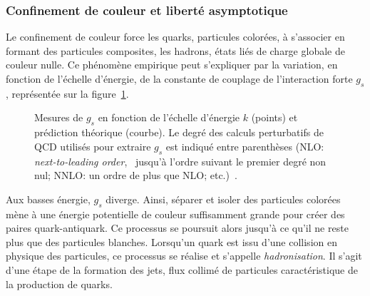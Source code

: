 \subsubsection{Confinement de couleur et liberté asymptotique}\label{chapter-MS-MSSM-section-formalisme-subsec-QCD-subsubsec-confinement}
Le confinement de couleur force les quarks, particules colorées, à s'associer en formant des particules composites, les hadrons, états liés de charge globale de couleur nulle. Ce phénomène empirique peut s'expliquer par la variation, en fonction de l'échelle d'énergie, de la constante de couplage de l'interaction forte $g_s$, représentée sur la figure~\ref{fig-g_s_fct_energy}.
\begin{figure}[h]
\centering
{}
\caption{Mesures de $g_s$ en fonction de l'échelle d'énergie $k$ (points) et prédiction théorique (courbe). Le degré des calculs perturbatifs de QCD utilisés pour extraire $g_s$ est indiqué entre parenthèses (NLO: \emph{next-to-leading order}, \ie\ jusqu'à l'ordre suivant le premier degré non nul; NNLO: un ordre de plus que NLO; etc.)~\cite{PDG_booklet_2018}.}
\label{fig-g_s_fct_energy}
\end{figure}
\par Aux basses énergie, $g_s$ diverge.
Ainsi, séparer et isoler des particules colorées mène à une énergie potentielle de couleur suffisamment grande pour créer des paires quark-antiquark. Ce processus se poursuit alors jusqu'à ce qu'il ne reste plus que des particules blanches. Lorsqu'un quark est issu d'une collision en physique des particules, ce processus se réalise et s'appelle \emph{hadronisation}. Il s'agit d'une étape de la formation des jets, flux collimé de particules caractéristique de la production de quarks.
